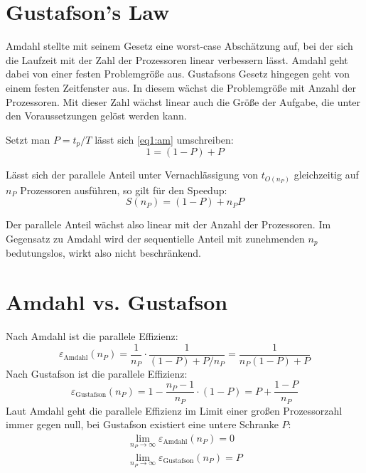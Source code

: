 		\section{Gustafson's Law}
		Amdahl stellte mit seinem Gesetz eine worst-case Abschätzung auf, bei der sich die Laufzeit mit der Zahl der Prozessoren linear verbessern lässt. Amdahl geht dabei von einer festen Problemgröße aus. Gustafsons Gesetz hingegen geht von einem festen Zeitfenster aus. In diesem wächst die Problemgröße mit Anzahl der Prozessoren. Mit dieser Zahl wächst linear auch die Größe der Aufgabe, die unter den Voraussetzungen gelöst werden kann.

		Setzt man $P=t_p/T$ lässt sich \ref{eq1:am} umschreiben:
		\begin{equation}
			1 = (1 - P) + P
		\end{equation}

    	Lässt sich der parallele Anteil unter Vernachlässigung von $t_{O(n_P)}$ gleichzeitig auf $n_P$ Prozessoren ausführen, so gilt für den \Gls{Speedup}:
    	\begin{equation}
        	S(n_P) = (1 - P) + n_P P
    	\end{equation}
		
		Der parallele Anteil wächst also linear mit der Anzahl der Prozessoren. Im Gegensatz zu Amdahl wird der sequentielle Anteil mit zunehmenden $n_p$ bedutungslos, wirkt also nicht beschränkend.
		 
        \section{Amdahl vs. Gustafson}		
        Nach Amdahl ist die \gls{parallele Effizienz}:
        \begin{equation}
            \varepsilon_{\text{Amdahl}}(n_P)    = \frac1{n_P}\cdot \frac1{(1-P)+P/n_P} = \frac1{n_P(1-P)+P}
        \end{equation} 
        Nach Gustafson ist die \gls{parallele Effizienz}:
        \begin{equation}
			\varepsilon_{\text{Gustafson}}(n_P) = 1 - \frac{n_P-1}{n_P}\cdot (1-P) = P +\frac{1-P}{n_P}
        \end{equation}
		Laut Amdahl geht die \gls{parallele Effizienz} im Limit einer großen Prozessorzahl immer gegen null, bei Gustafson existiert eine untere Schranke $P$:
        \begin{gather*}
        	\lim\limits_{n_P \rightarrow \infty}\varepsilon_{\text{Amdahl}}(n_P)    = 0 \\        
        	\lim\limits_{n_P \rightarrow \infty}\varepsilon_{\text{Gustafson}}(n_P) = P
        \end{gather*}
        
